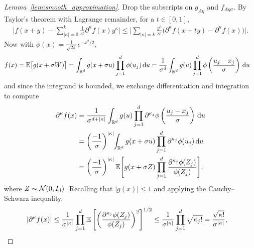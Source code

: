 \begin{proof}[Lemma~\ref{lem:smooth_approximation}]
  Drop the subscripts on $g_{A\eta}$ and $f_{A \eta \sigma}$.
  By Taylor's theorem with Lagrange remainder, for a $t \in [0,1]$,
  \begin{align*}
    \Bigg|
    f(x + y)
    - \sum_{|\kappa|=0}^{k}
    \frac{1}{\kappa!}
    \partial^{\kappa} f(x)
    y^\kappa
    \Bigg|
    \leq
    \Bigg|
    \sum_{|\kappa|=k}
    \frac{y^\kappa}{\kappa!}
    \big(
      \partial^{\kappa} f(x + t y)
      - \partial^{\kappa} f(x)
    \big)
    \Bigg|.
  \end{align*}
  Now with $\phi(x) = \frac{1}{\sqrt{2 \pi}} e^{-x^2/2}$,
  \begin{align*}
    f(x)
    &=
    \mathbb{E}\big[g(x + \sigma W) \big]
    =
    \int_{\mathbb{R}^d}
    g(x + \sigma u)
    \prod_{j=1}^{d}
    \phi(u_j)
    \,\mathrm{d}u
    =
    \frac{1}{\sigma^d}
    \int_{\mathbb{R}^d}
    g(u)
    \prod_{j=1}^{d}
    \phi \left( \frac{u_j-x_j}{\sigma} \right)
    \,\mathrm{d}u
  \end{align*}
  and since the integrand is bounded, we exchange differentiation and
  integration to compute
  \begin{align}
    \nonumber
    \partial^\kappa
    f(x)
    &=
    \frac{1}{\sigma^{d+|\kappa|}}
    \int_{\mathbb{R}^d}
    g(u)
    \prod_{j=1}^{d}
    \partial^{\kappa_j}
    \phi \left( \frac{u_j-x_j}{\sigma} \right)
    \,\mathrm{d}u \\
    \nonumber
    &=
    \left( \frac{-1}{\sigma} \right)^{|\kappa|}
    \hspace*{-1mm}
    \int_{\mathbb{R}^d}
    g(x + \sigma u)
    \prod_{j=1}^{d}
    \partial^{\kappa_j}
    \phi(u_j)
    \,\mathrm{d}u \\
    \label{eq:smoothing_derivative}
    &=
    \left( \frac{-1}{\sigma} \right)^{|\kappa|}
    \mathbb{E} \Bigg[
      g(x + \sigma Z)
      \prod_{j=1}^{d}
      \frac{\partial^{\kappa_j}\phi(Z_j)}{\phi(Z_j)}
    \Bigg],
  \end{align}
  where $Z \sim \mathcal{N}(0, I_d)$.
  Recalling that $|g(x)| \leq 1$ and applying the Cauchy--Schwarz inequality,
  \begin{align*}
    \left|
    \partial^\kappa
    f(x)
    \right|
    &\leq
    \frac{1}{\sigma^{|\kappa|}}
    \prod_{j=1}^{d}
    \mathbb{E} \left[
      \left(
        \frac{\partial^{\kappa_j}\phi(Z_j)}{\phi(Z_j)}
      \right)^2
    \right]^{1/2}
    \leq
    \frac{1}{\sigma^{|\kappa|}}
    \prod_{j=1}^{d}
    \sqrt{\kappa_j!}
    =
    \frac{\sqrt{\kappa!}}{\sigma^{|\kappa|}},
  \end{align*}

\end{proof}
